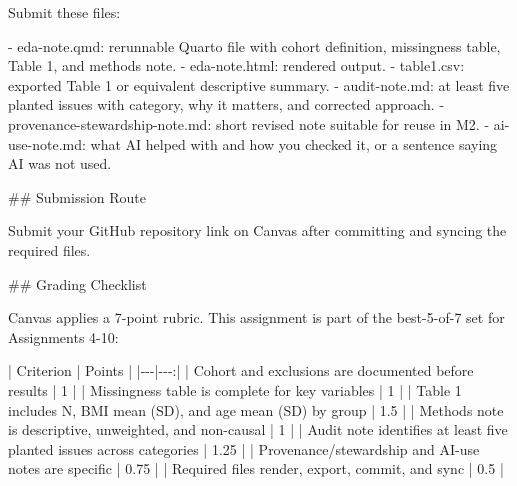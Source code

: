 \documentclass[
  letterpaper,
  DIV=11,
  numbers=noendperiod,
  oneside]{scrreprt}
\newenvironment{Shaded}{\begin{snugshade}}{\end{snugshade}}
\newcommand{\FunctionTok}[1]{\textcolor[rgb]{0.28,0.35,0.67}{#1}}
\newcommand{\InformationTok}[1]{\textcolor[rgb]{0.37,0.37,0.37}{#1}}
\newcommand{\NormalTok}[1]{\textcolor[rgb]{0.00,0.23,0.31}{#1}}
\newcommand{\PreprocessorTok}[1]{\textcolor[rgb]{0.68,0.00,0.00}{#1}}
\newcommand{\SpecialStringTok}[1]{\textcolor[rgb]{0.13,0.47,0.30}{#1}}
\begin{document}
\begin{Shaded}
\begin{Highlighting}[numbers=left,,]
\NormalTok{Submit these files:}

\SpecialStringTok{{-} }\InformationTok{\textasciigrave{}eda{-}note.qmd\textasciigrave{}}\NormalTok{: rerunnable Quarto file with cohort definition, missingness table, Table 1, and methods note.}
\SpecialStringTok{{-} }\InformationTok{\textasciigrave{}eda{-}note.html\textasciigrave{}}\NormalTok{: rendered output.}
\SpecialStringTok{{-} }\InformationTok{\textasciigrave{}table1.csv\textasciigrave{}}\NormalTok{: exported Table 1 or equivalent descriptive summary.}
\SpecialStringTok{{-} }\InformationTok{\textasciigrave{}audit{-}note.md\textasciigrave{}}\NormalTok{: at least five planted issues with category, why it matters, and corrected approach.}
\SpecialStringTok{{-} }\InformationTok{\textasciigrave{}provenance{-}stewardship{-}note.md\textasciigrave{}}\NormalTok{: short revised note suitable for reuse in M2.}
\SpecialStringTok{{-} }\InformationTok{\textasciigrave{}ai{-}use{-}note.md\textasciigrave{}}\NormalTok{: what AI helped with and how you checked it, or a sentence saying AI was not used.}

\FunctionTok{\#\# Submission Route}

\NormalTok{Submit your GitHub repository link on Canvas after committing and syncing the required files.}

\FunctionTok{\#\# Grading Checklist}

\NormalTok{Canvas applies a 7{-}point rubric. This assignment is part of the best{-}5{-}of{-}7 set for Assignments 4{-}10:}

\PreprocessorTok{|}\NormalTok{ Criterion }\PreprocessorTok{|}\NormalTok{ Points }\PreprocessorTok{|}
\PreprocessorTok{|{-}{-}{-}|{-}{-}{-}:|}
\PreprocessorTok{|}\NormalTok{ Cohort and exclusions are documented before results }\PreprocessorTok{|}\NormalTok{ 1 }\PreprocessorTok{|}
\PreprocessorTok{|}\NormalTok{ Missingness table is complete for key variables }\PreprocessorTok{|}\NormalTok{ 1 }\PreprocessorTok{|}
\PreprocessorTok{|}\NormalTok{ Table 1 includes N, BMI mean (SD), and age mean (SD) by group }\PreprocessorTok{|}\NormalTok{ 1.5 }\PreprocessorTok{|}
\PreprocessorTok{|}\NormalTok{ Methods note is descriptive, unweighted, and non{-}causal }\PreprocessorTok{|}\NormalTok{ 1 }\PreprocessorTok{|}
\PreprocessorTok{|}\NormalTok{ Audit note identifies at least five planted issues across categories }\PreprocessorTok{|}\NormalTok{ 1.25 }\PreprocessorTok{|}
\PreprocessorTok{|}\NormalTok{ Provenance/stewardship and AI{-}use notes are specific }\PreprocessorTok{|}\NormalTok{ 0.75 }\PreprocessorTok{|}
\PreprocessorTok{|}\NormalTok{ Required files render, export, commit, and sync }\PreprocessorTok{|}\NormalTok{ 0.5 }\PreprocessorTok{|}


\end{Highlighting}
\end{Shaded}
\end{document}
